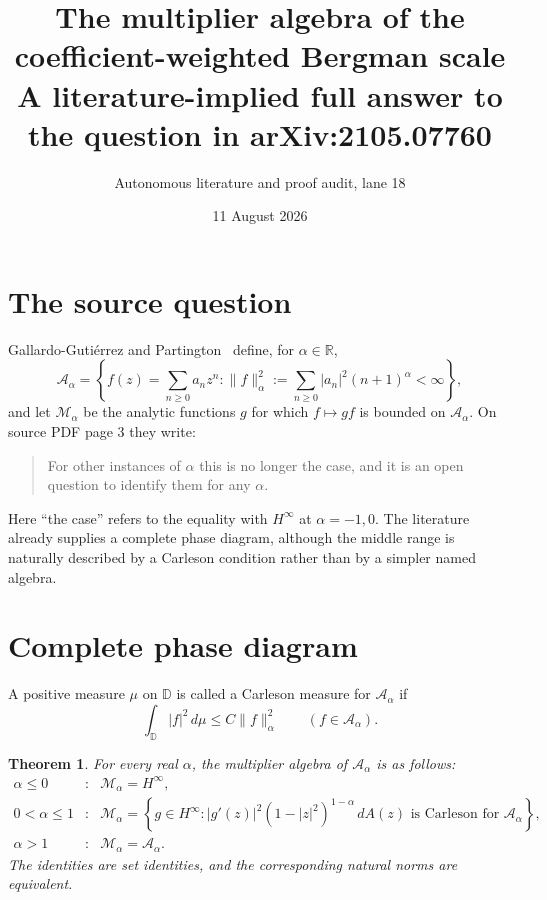\documentclass[11pt]{article}
\title{The multiplier algebra of the coefficient-weighted Bergman scale\\
\large A literature-implied full answer to the question in arXiv:2105.07760}
\author{Autonomous literature and proof audit, lane 18}
\date{11 August 2026}
\newtheorem{theorem}{Theorem}
\newcommand{\D}{\mathbb D}
\newcommand{\A}{\mathcal A}
\newcommand{\M}{\mathcal M}
\begin{document}
\maketitle

\begin{center}
\end{center}

\section{The source question}

Gallardo-Guti\'errez and Partington~\cite{source} define, for
$\alpha\in\mathbb R$,
\[
 \A_\alpha=\left\{f(z)=\sum_{n\geq0}a_nz^n:
 \|f\|_\alpha^2:=\sum_{n\geq0}|a_n|^2(n+1)^\alpha<\infty\right\},
\]
and let $\M_\alpha$ be the analytic functions $g$ for which
$f\mapsto gf$ is bounded on $\A_\alpha$. On source PDF page 3 they write:
\begin{quote}
For other instances of $\alpha$ this is no longer the case, and it is an open
question to identify them for any $\alpha$.
\end{quote}
Here ``the case'' refers to the equality with $H^\infty$ at $\alpha=-1,0$.
The literature already supplies a complete phase diagram, although the middle
range is naturally described by a Carleson condition rather than by a simpler
named algebra.

\section{Complete phase diagram}

A positive measure $\mu$ on $\D$ is called a Carleson measure for $\A_\alpha$
if
\[
 \int_\D |f|^2\,d\mu\leq C\|f\|_\alpha^2
 \qquad(f\in\A_\alpha).
\]

\begin{theorem}\label{thm:phase}
For every real $\alpha$, the multiplier algebra of $\A_\alpha$ is as follows:
\[
\begin{array}{ccl}
\alpha\leq0
 &:& \M_\alpha=H^\infty,\\[2mm]
0<\alpha\leq1
 &:& \displaystyle
 \M_\alpha=\left\{g\in H^\infty:
 |g'(z)|^2(1-|z|^2)^{1-\alpha}\,dA(z)
 \text{ is Carleson for }\A_\alpha\right\},\\[3mm]
\alpha>1
 &:& \M_\alpha=\A_\alpha.
\end{array}
\]
The identities are set identities, and the corresponding natural norms are
equivalent.
\end{theorem}
\end{document}
